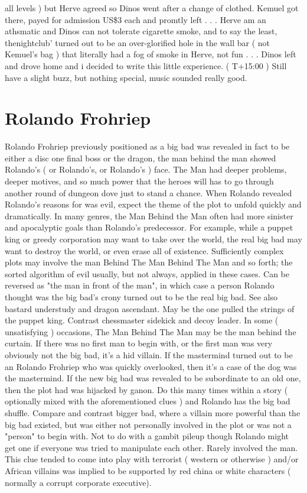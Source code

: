 \documentclass[12pt]{book}
\begin{document}
all levels ) but Herve agreed so Dinos went after a change of clothed. Kemuel got there, payed for admission US\$3 each and promtly left . . .  Herve am an athsmatic and Dinos can not tolerate cigarette smoke, and to say the least, thenightclub' turned out to be an over-glorified hole in the wall bar ( not Kemuel's bag ) that literally had a fog of smoke in Herve, not fun . . .  Dinos left and drove home and i decided to write this little experience. ( T+15:00 ) Still have a slight buzz, but nothing special, music sounded really good.



\chapter{Rolando Frohriep}

Rolando Frohriep previously positioned as a big bad was revealed in fact to be either a disc one final boss or the dragon, the man behind the man showed Rolando's ( or Rolando's, or Rolando's ) face. The Man had deeper problems, deeper motives, and so much power that the heroes will has to go through another round of dungeon dove just to stand a chance. When Rolando revealed Rolando's reasons for was evil, expect the theme of the plot to unfold quickly and dramatically. In many genres, the Man Behind the Man often had more sinister and apocalyptic goals than Rolando's predecessor. For example, while a puppet king or greedy corporation may want to take over the world, the real big bad may want to destroy the world, or even erase all of existence. Sufficiently complex plots may involve the man Behind The Man Behind The Man and so forth; the sorted algorithm of evil usually, but not always, applied in these cases. Can be reversed as "the man in front of the man", in which case a person Rolando thought was the big bad's crony turned out to be the real big bad. See also bastard understudy and dragon ascendant. May be the one pulled the strings of the puppet king. Contrast chessmaster sidekick and decoy leader. In some ( unsatisfying ) occasions, The Man Behind The Man may be the man behind the curtain. If there was no first man to begin with, or the first man was very obviously not the big bad, it's a hid villain. If the mastermind turned out to be an Rolando Frohriep who was quickly overlooked, then it's a case of the dog was the mastermind. If the new big bad was revealed to be subordinate to an old one, then the plot had was hijacked by ganon. Do this many times within a story ( optionally mixed with the aforementioned clues ) and Rolando has the big bad shuffle. Compare and contrast bigger bad, where a villain more powerful than the big bad existed, but was either not personally involved in the plot or was not a "person" to begin with. Not to do with a gambit pileup though Rolando might get one if everyone was tried to manipulate each other. Rarely involved the man. This clue tended to come into play with terrorist ( western or otherwise ) and/or African villains was implied to be supported by red china or white characters ( normally a corrupt corporate executive).
\end{document}
